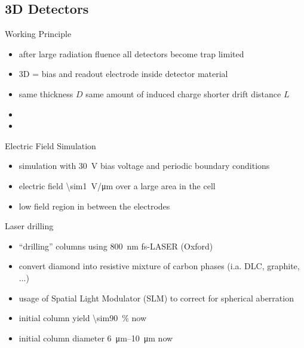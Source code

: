 \subsection{3D Detectors}
\begin{frame}{Working Principle}

	\vspace*{-10pt}\vspace*{-10pt}
	
	\begin{itemize}\itemfill
		\item after large radiation fluence all detectors become trap limited
		\item 3D = bias and readout electrode inside detector material
		\item same thickness $D$ \ra same amount of induced charge \ra shorter drift distance $L$
		\item {}
		\item {}
	\end{itemize}

\end{frame}
\begin{frame}{Electric Field Simulation}

	\vspace*{-10pt}
	
	\begin{itemize}\itemfill
		\item simulation with \SI{30}{\volt} bias voltage and periodic boundary conditions
		\item electric field \SI{\sim1}{\volt/\micro\meter} over a large area in the cell
		\item low field region in between the electrodes
	\end{itemize}

\end{frame}


\begin{frame}{Laser drilling}

	\begin{itemize}\itemfill
		\item ``drilling'' columns using \SI{800}{\nano\meter} fs-LASER (Oxford)
		\item convert diamond into resistive mixture of carbon phases (i.a. DLC, graphite, ...)
		\item usage of Spatial Light Modulator (SLM) to correct for spherical aberration
		\item initial column yield \SI{\sim90}{\%} \ra now 
		\item  initial column diameter \SIrange{6}{10}{\micro\meter} \ra now 
	\end{itemize}
	
	\vspace*{-10pt}
	
\end{frame}

